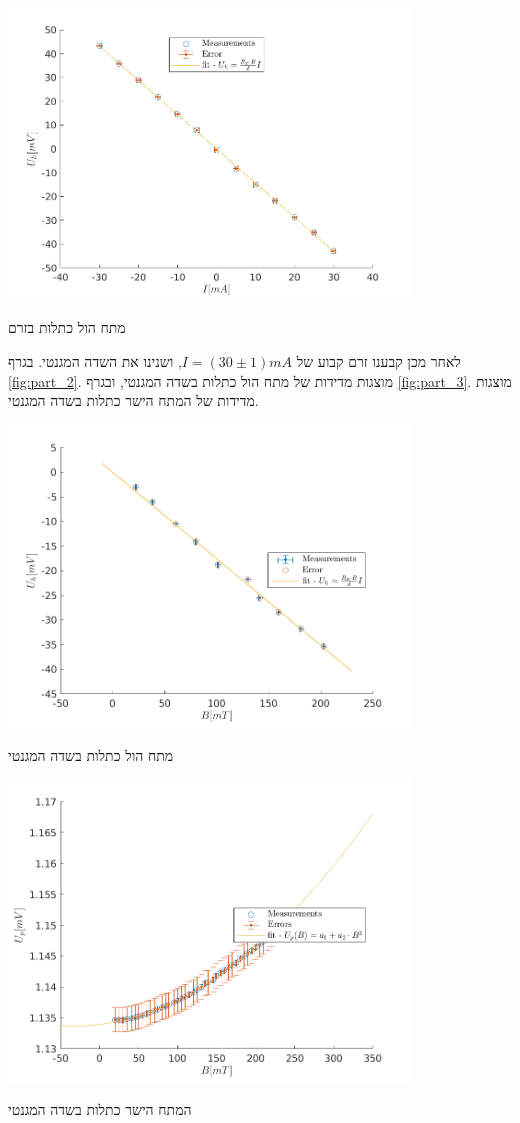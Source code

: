 \documentclass{article}
\begin{document}
\begin{graph}[ht!]
    \centering
    \includegraphics[width=0.8\textwidth]{part1 - R_h.png}
    \caption{מתח הול כתלות בזרם}
    \label{fig:part_1}
\end{graph}
לאחר מכן קבענו זרם קבוע של
$I = (30 \pm 1) mA$,
ושנינו את השדה המגנטי.
בגרף
\ref{fig:part_2}.
מוצגות מדידות של מתח הול כתלות בשדה המגנטי,
ובגרף
\ref{fig:part_3}.
מוצגות מדידות של המתח הישר כתלות בשדה המגנטי.

\begin{graph}[ht!]
    \centering
    \includegraphics[width=0.8\textwidth]{part2 - R_h.png}
    \caption{מתח הול כתלות בשדה המגנטי}
    \label{fig:part_2}
\end{graph}

\begin{graph}[ht!]
    \centering
    \includegraphics[width=0.8\textwidth]{part3 - B-squared relation}
    \caption{המתח הישר כתלות בשדה המגנטי}
    \label{fig:part_3}
\end{graph}
    
\end{document}
